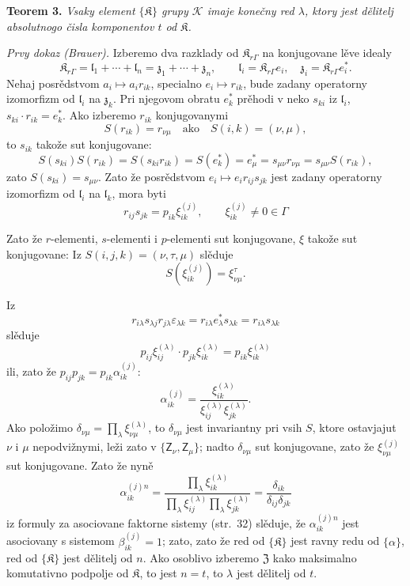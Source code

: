 \documentclass[11pt]{article}
\begin{document}
\textbf{Teorem 3.} \emph{Vsaky element \(\{\mathfrak K\}\) grupy \(\mathscr K\) imaje konečny red \(\lambda\), ktory jest dělitelj absolutnogo čisla komponentov \(t\) od \(\mathfrak K\).}

\emph{Prvy dokaz (Brauer).} Izberemo dva razklady od \(\mathfrak K_{r\Gamma}\) na konjugovane lěve idealy
\[
\mathfrak K_{r\Gamma}=\mathfrak l_1+\cdots+\mathfrak l_n=\mathfrak z_1+\cdots+\mathfrak z_n,\qquad
\mathfrak l_i=\mathfrak K_{r\Gamma}e_i,\quad
\mathfrak z_i=\mathfrak K_{r\Gamma}e_i^*.
\]
Nehaj posrědstvom \(a_i\mapsto a_ir_{ik}\), specialno \(e_i\mapsto r_{ik}\), bude zadany operatorny izomorfizm od \(\mathfrak l_i\) na \(\mathfrak z_k\). Pri njegovom obratu \(e_k^*\) prěhodi v neko \(s_{ki}\) iz \(\mathfrak l_i\), \(s_{ki}\cdot r_{ik}=e_k^*\). Ako izberemo \(r_{ik}\) konjugovanymi
\[
S(r_{ik})=r_{\nu\mu}\quad\text{ako}\quad S(i,k)=(\nu,\mu),
\]
to \(s_{ik}\) takože sut konjugovane:
\[
S(s_{ki})S(r_{ik})=S(s_{ki}r_{ik})=S(e_k^*)=e_\mu^*
=s_{\mu\nu}r_{\nu\mu}=s_{\mu\nu}S(r_{ik}),
\]
zato \(S(s_{ki})=s_{\mu\nu}\). Zato že posrědstvom \(e_i\mapsto e_ir_{ij}s_{jk}\) jest zadany operatorny izomorfizm od \(\mathfrak l_i\) na \(\mathfrak l_k\), mora byti
\[
r_{ij}s_{jk}=p_{ik}\xi_{ik}^{(j)},\qquad
\xi_{ik}^{(j)}\ne0\in\Gamma
\]

Zato že \(r\)-elementi, \(s\)-elementi i \(p\)-elementi sut konjugovane, \(\xi\) takože sut konjugovane: Iz \(S(i,j,k)=(\nu,\tau,\mu)\) slěduje
\[
S(\xi_{ik}^{(j)})=\xi_{\nu\mu}^{\tau}.
\]

Iz
\[
r_{i\lambda}s_{\lambda j}r_{j\lambda}\varepsilon_{\lambda k}
=r_{i\lambda}e_\lambda^*s_{\lambda k}
=r_{i\lambda}s_{\lambda k}
\]
slěduje
\[
p_{ij}\xi_{ij}^{(\lambda)}\cdot p_{jk}\xi_{ik}^{(\lambda)}
=p_{ik}\xi_{ik}^{(\lambda)}
\]
ili, zato že \(p_{ij}p_{jk}=p_{ik}\alpha_{ik}^{(j)}\):
\[
\alpha_{ik}^{(j)}
=\frac{\xi_{ik}^{(\lambda)}}{\xi_{ij}^{(\lambda)}\xi_{jk}^{(\lambda)}}.
\]
Ako položimo \(\delta_{\nu\mu}=\prod_{\lambda}\xi_{\nu\mu}^{(\lambda)}\), to \(\delta_{\nu\mu}\) jest invariantny pri vsih \(S\), ktore ostavjajut \(\nu\) i \(\mu\) nepodvižnymi, leži zato v \(\{\mathsf{Z}_\nu,\mathsf{Z}_\mu\}\); nadto \(\delta_{\nu\mu}\) sut konjugovane, zato že \(\xi_{\nu\mu}^{(j)}\) sut konjugovane. Zato že nyně
\[
\alpha_{ik}^{(j)n}
=\frac{\prod_{\lambda}\xi_{ik}^{(\lambda)}}
       {\prod_{\lambda}\xi_{ij}^{(\lambda)}\prod_{\lambda}\xi_{jk}^{(\lambda)}}
=\frac{\delta_{ik}}{\delta_{ij}\delta_{jk}}
\]
iz formuly za asociovane faktorne sistemy (str.~32) slěduje, že \(\alpha_{ik}^{(j)n}\) jest asociovany s sistemom \(\beta_{ik}^{(j)}=1\); zato, zato že red od \(\{\mathfrak K\}\) jest ravny redu od \(\{\alpha\}\), red od \(\{\mathfrak K\}\) jest dělitelj od \(n\). Ako osoblivo izberemo \(\mathfrak Z\) kako maksimalno komutativno podpolje od \(\mathfrak K\), to jest \(n=t\), to \(\lambda\) jest dělitelj od \(t\).
\end{document}
